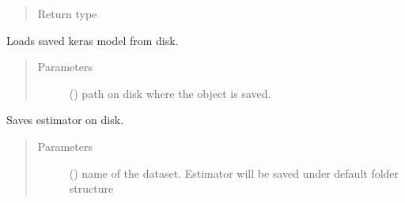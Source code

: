 \documentclass[letterpaper,10pt,english]{sphinxmanual}
\begin{document}
\begin{fulllineitems}
\begin{fulllineitems}
\begin{quote}
\begin{description}
\begin{itemize}
\end{itemize}

\item[{Return type}] \leavevmode
{}

\end{description}\end{quote}

\end{fulllineitems}


\begin{fulllineitems}
\label{\detokenize{estimators:mleap.estimators.nn_estimators.Deep_NN_Regressor.load}}
Loads saved keras model from disk.
\begin{quote}\begin{description}
\item[{Parameters}] \leavevmode
{} () \textendash{} path on disk where the object is saved.

\end{description}\end{quote}

\end{fulllineitems}


\begin{fulllineitems}
\label{\detokenize{estimators:mleap.estimators.nn_estimators.Deep_NN_Regressor.save}}
Saves estimator on disk.
\begin{quote}\begin{description}
\item[{Parameters}] \leavevmode
{} () \textendash{} name of the dataset. Estimator will be saved under default folder structure 

\end{description}\end{quote}

\end{fulllineitems}


\end{fulllineitems}
\end{document}
